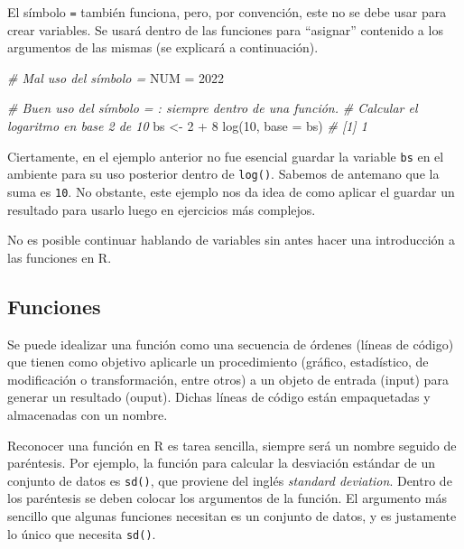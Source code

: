 \documentclass[
]{article}
\newenvironment{Shaded}{\begin{snugshade}}{\end{snugshade}}
\newcommand{\AttributeTok}[1]{\textcolor[rgb]{0.77,0.63,0.00}{#1}}
\newcommand{\CommentTok}[1]{\textcolor[rgb]{0.56,0.35,0.01}{\textit{#1}}}
\newcommand{\DecValTok}[1]{\textcolor[rgb]{0.00,0.00,0.81}{#1}}
\newcommand{\FunctionTok}[1]{\textcolor[rgb]{0.00,0.00,0.00}{#1}}
\newcommand{\NormalTok}[1]{#1}
\newcommand{\OtherTok}[1]{\textcolor[rgb]{0.56,0.35,0.01}{#1}}
\newcommand{\SpecialCharTok}[1]{\textcolor[rgb]{0.00,0.00,0.00}{#1}}
\theoremstyle{definition}
\theoremstyle{definition}
\theoremstyle{definition}
\theoremstyle{definition}
\theoremstyle{remark}
\begin{document}
El símbolo \texttt{=} también funciona, pero, por convención, este no se debe usar para crear variables. Se usará dentro de las funciones para ``asignar'' contenido a los argumentos de las mismas (se explicará a continuación).

\begin{Shaded}
\begin{Highlighting}[]
\CommentTok{\# Mal uso del símbolo =}
\NormalTok{NUM }\OtherTok{=} \DecValTok{2022}

\CommentTok{\# Buen uso del símbolo = : siempre dentro de una función.}
\CommentTok{\# Calcular el logaritmo en base 2 de 10}
\NormalTok{bs }\OtherTok{\textless{}{-}} \DecValTok{2} \SpecialCharTok{+} \DecValTok{8}
\FunctionTok{log}\NormalTok{(}\DecValTok{10}\NormalTok{, }\AttributeTok{base =}\NormalTok{ bs)}
\CommentTok{\# [1] 1}
\end{Highlighting}
\end{Shaded}

\begin{rstudio-tip}
Ciertamente, en el ejemplo anterior no fue esencial guardar la variable \texttt{bs} en el ambiente para su uso posterior dentro de \texttt{log()}. Sabemos de antemano que la suma es \texttt{10}. No obstante, este ejemplo nos da idea de como aplicar el guardar un resultado para usarlo luego en ejercicios más complejos.
\end{rstudio-tip}

No es posible continuar hablando de variables sin antes hacer una introducción a las funciones en R.

\hypertarget{funciones}{%
\subsection{Funciones}\label{funciones}}

Se puede idealizar una función como una secuencia de órdenes (líneas de código) que tienen como objetivo aplicarle un procedimiento (gráfico, estadístico, de modificación o transformación, entre otros) a un objeto de entrada (input) para generar un resultado (ouput). Dichas líneas de código están empaquetadas y almacenadas con un nombre.

Reconocer una función en R es tarea sencilla, siempre será un nombre seguido de paréntesis. Por ejemplo, la función para calcular la desviación estándar de un conjunto de datos es \texttt{sd()}, que proviene del inglés \emph{standard deviation}. Dentro de los paréntesis se deben colocar los argumentos de la función. El argumento más sencillo que algunas funciones necesitan es un conjunto de datos, y es justamente lo único que necesita \texttt{sd()}.
\end{document}
